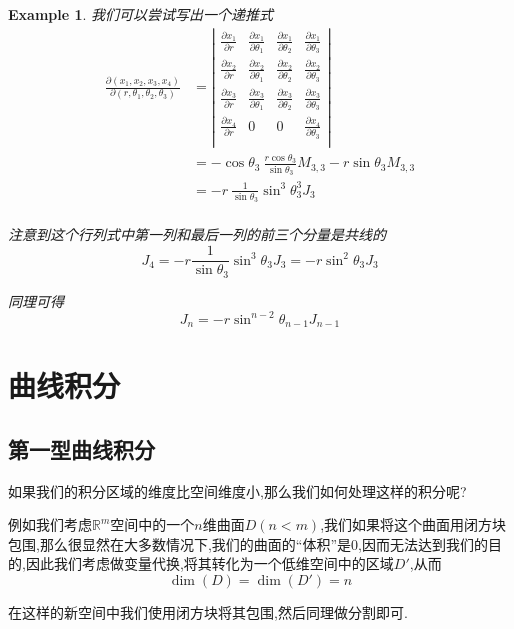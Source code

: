 \documentclass[11pt,hyperref,a4paper,UTF8]{ctexart}
\newtheorem{example}{Example}[subsection]
\newcommand{\RR}{\mathbb{R}}
\begin{document}
\begin{CJK}{UTF8}{gkai}
\begin{example}
  我们可以尝试写出一个递推式
  \[
  \begin{aligned}
  \frac{\partial(x_1,x_2,x_3,x_4)}{\partial (r,\theta_1,\theta_2,\theta_3)} &= \left|\begin{matrix}
    \frac{\partial x_1}{\partial r}&\frac{\partial x_1}{\partial \theta_1}&\frac{\partial x_1}{\partial \theta_2}&\frac{\partial x_1}{\partial \theta_3}\\
    \frac{\partial x_2}{\partial r}&\frac{\partial x_2}{\partial \theta_1}&\frac{\partial x_2}{\partial \theta_2}&\frac{\partial x_2}{\partial \theta_3}\\
    \frac{\partial x_3}{\partial r}&\frac{\partial x_3}{\partial \theta_1}&\frac{\partial x_3}{\partial \theta_2}&\frac{\partial x_3}{\partial \theta_3}\\
    \frac{\partial x_4}{\partial r}&0&0&\frac{\partial x_4}{\partial \theta_3}\\
  \end{matrix} \right|\\
    &= -\cos \theta_3~ \frac{r \cos \theta_3}{\sin \theta_3} M_{3,3} - r\sin \theta_3 M_{3,3}\\
    &=  - r ~\frac{1}{\sin \theta_3} \sin^3 \theta_3^3 J_3\\
\end{aligned}
  \]

  注意到这个行列式中第一列和最后一列的前三个分量是共线的
  \[J_4 = - r \frac{1}{\sin\theta_3} \sin^3 \theta_3 J_3 = -  r \sin^2 \theta_3 J_3\]

  同理可得
  \[J_n = -r \sin^{n - 2} \theta_{n - 1} J_{n - 1}\]
\end{example}

\section{曲线积分}
\subsection{第一型曲线积分}
如果我们的积分区域的维度比空间维度小,那么我们如何处理这样的积分呢?

例如我们考虑$\RR^m$空间中的一个$n$维曲面$D$$(n < m)$,我们如果将这个曲面用闭方块包围,那么很显然在大多数情况下,我们的曲面的``体积''是$0$,因而无法达到我们的目的,因此我们考虑做变量代换,将其转化为一个低维空间中的区域$D'$,从而
\[\dim (D) = \dim (D') = n\]

在这样的新空间中我们使用闭方块将其包围,然后同理做分割即可.\\


\end{CJK}
\end{document}
